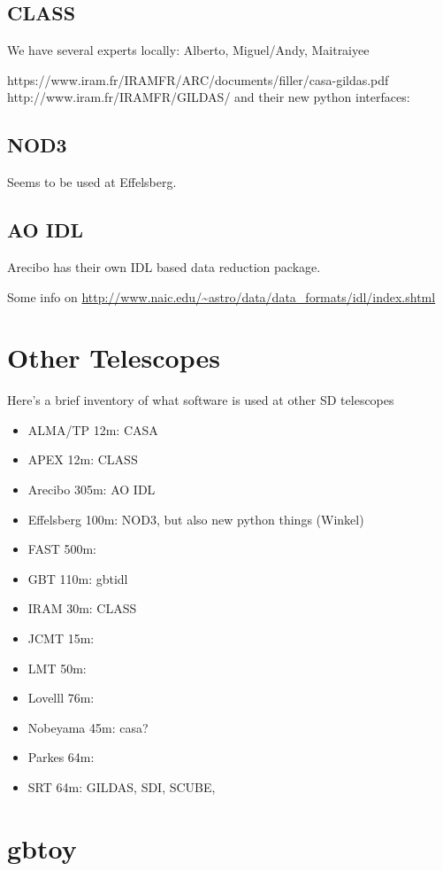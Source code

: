 \documentclass[12pt,a4paper]{article}
\begin{document}
\subsection{CLASS}

We have several experts locally: Alberto, Miguel/Andy, Maitraiyee
  
 https://www.iram.fr/IRAMFR/ARC/documents/filler/casa-gildas.pdf
      http://www.iram.fr/IRAMFR/GILDAS/
      and their new python interfaces:

\subsection{NOD3}

Seems to be used at Effelsberg.

\subsection{AO IDL}

Arecibo has their own IDL based data reduction package.

Some info on \url{http://www.naic.edu/~astro/data/data_formats/idl/index.shtml}

\section{Other Telescopes}

Here's a brief inventory of what software is used at other SD telescopes
\begin{itemize}
  \item ALMA/TP 12m: CASA
  \item APEX 12m: CLASS
  \item Arecibo 305m: AO IDL
  \item Effelsberg 100m:  NOD3, but also new python things (Winkel)
  \item FAST 500m:
  \item GBT 110m:  gbtidl
  \item IRAM 30m: CLASS
  \item JCMT 15m:
  \item LMT 50m:
  \item Lovelll 76m:
  \item Nobeyama 45m:   casa?
  \item Parkes 64m:
  \item SRT 64m: GILDAS, SDI, SCUBE, 
\end{itemize}       
       

\section{gbtoy}       
\end{document}
